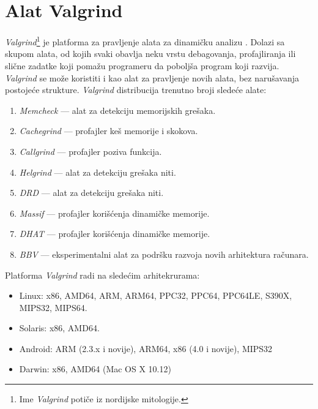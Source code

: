 \documentclass[12pt,oneside]{memoir}
\theoremstyle{plain}
\theoremstyle{definition}
\begin{document}
\chapter{Alat Valgrind}
\textit{Valgrind}\footnote{ Ime \textit{Valgrind} potiče iz nordijske mitologije.} je platforma za pravljenje alata za dinamičku analizu \cite{Valgrind}. Dolazi sa skupom alata, od kojih svaki obavlja neku vrstu debagovanja, profajliranja ili slične zadatke koji pomažu programeru da poboljša program koji razvija. \textit{Valgrind} se može koristiti i kao alat za pravljenje novih alata, bez narušavanja postojeće strukture. 
\textit{Valgrind} distribucija trenutno broji sledeće alate:
\begin{enumerate}
  \item \textit{Memcheck} \cite{Memcheck} --- alat za detekciju memorijskih grešaka.
  \item \textit{Cachegrind}  \cite{Cachegrind} --- profajler keš memorije i skokova. 
  \item \textit{Callgrind} \cite{Callgrind} --- profajler poziva funkcija.
  \item \textit{Helgrind} \cite{Helgrind} --- alat za detekciju grešaka niti.
  \item \textit{DRD} \cite{Drd} --- alat za detekciju grešaka niti. 
  \item \textit{Massif} \cite{Massif} --- profajler korišćenja dinamičke memorije.
  \item \textit{DHAT} \cite{DHAT} --- profajler korišćenja dinamičke memorije. %
  \item \textit{BBV} \cite{BBV} --- eksperimentalni alat za podršku razvoja novih arhitektura računara. %
\end{enumerate}
Platforma \textit{Valgrind} radi na sledećim arhitekrurama:
\begin{itemize}
  \item Linux: x86, AMD64, ARM, ARM64, PPC32, PPC64, PPC64LE, S390X, MIPS32, MIPS64.
  \item Solaris: x86, AMD64. 
  \item Android: ARM (2.3.x i novije), ARM64, x86 (4.0 i novije), MIPS32 
  \item Darwin: x86, AMD64 (Mac OS X 10.12)\cite{Valgrind}
\end{itemize}
\end{document}
